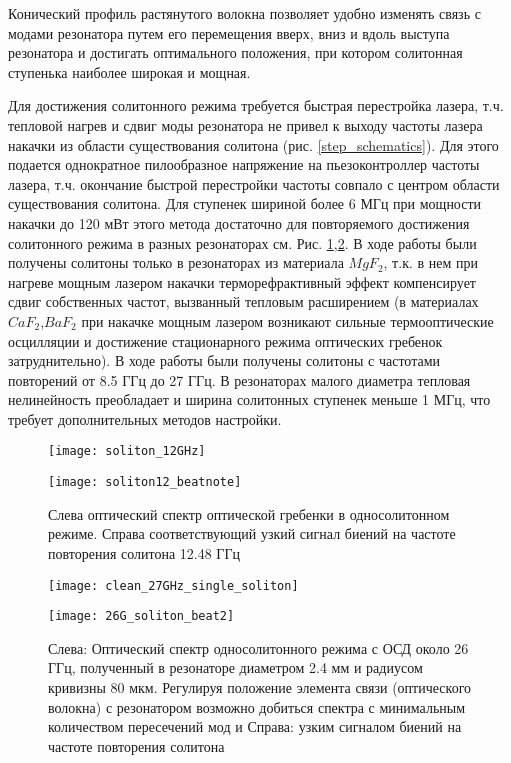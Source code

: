 Конический профиль растянутого волокна позволяет удобно изменять связь с модами резонатора путем его перемещения вверх, вниз и вдоль выступа резонатора и достигать оптимального положения, при котором солитонная ступенька наиболее широкая и мощная.

Для достижения солитонного режима требуется быстрая перестройка лазера, т.ч. тепловой нагрев и сдвиг моды резонатора не привел к выходу частоты лазера накачки из области существования солитона (рис. \ref{step_schematics}). Для этого подается однократное пилообразное напряжение на пьезоконтроллер частоты лазера, т.ч. окончание быстрой перестройки частоты совпало с центром области существования солитона. Для ступенек шириной более 6 МГц при мощности накачки до 120 мВт этого метода достаточно для повторяемого достижения солитонного режима в разных резонаторах см. Рис. \ref{soliton_12GHz},\ref{clean_27GHz_single_soliton}. В ходе работы были получены солитоны только в резонаторах из материала $MgF_2$, т.к. в нем при нагреве мощным лазером накачки терморефрактивный эффект компенсирует сдвиг собственных частот, вызванный тепловым расширением (в материалах $CaF_2$,$BaF_2$ при накачке мощным лазером возникают сильные термооптические осцилляции и достижение стационарного режима оптических гребенок затруднительно). В ходе работы были получены солитоны с частотами повторений от 8.5 ГГц до 27 ГГц. В резонаторах малого диаметра тепловая нелинейность преобладает и ширина солитонных ступенек меньше 1 МГц, что требует дополнительных методов настройки.

\begin{figure}[ht]
  \begin{minipage}[ht]{0.49\linewidth}\centering
    \texttt{[image: soliton\_12GHz]}
  \end{minipage}
  \hfill
  \begin{minipage}[ht]{0.49\linewidth}\centering
    \texttt{[image: soliton12\_beatnote]}
  \end{minipage}
  \caption{Слева оптический спектр оптической гребенки в односолитонном режиме. Справа соответствующий узкий сигнал биений на частоте повторения солитона 12.48 ГГц}
  \label{soliton_12GHz}
\end{figure}


\begin{figure}[ht]
  \begin{minipage}[ht]{0.49\linewidth}\centering
    \texttt{[image: clean\_27GHz\_single\_soliton]}
  \end{minipage}
  \hfill
  \begin{minipage}[ht]{0.49\linewidth}\centering
    \texttt{[image: 26G\_soliton\_beat2]}
  \end{minipage}
  \caption{Слева: Оптический спектр односолитонного режима с ОСД около 26 ГГц, полученный в резонаторе диаметром 2.4 мм и радиусом кривизны 80 мкм. Регулируя положение элемента связи (оптического волокна) с резонатором возможно добиться спектра с минимальным количеством пересечений мод и Справа: узким сигналом биений на частоте повторения солитона }
  \label{clean_27GHz_single_soliton}
\end{figure}


